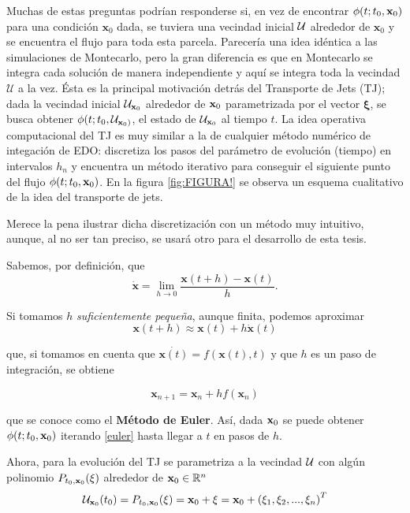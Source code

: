 Muchas de estas preguntas podrían responderse si, en vez de encontrar $\phi(t;t_0,\mathbf{x}_0)$ para una condición $\mathbf{x}_0$ dada, se tuviera una vecindad inicial $\mathcal{U}$ alrededor de $\mathbf{x}_0$ y se encuentra el flujo para toda esta parcela. Parecería una idea idéntica a las simulaciones de Montecarlo, pero la gran diferencia es que en Montecarlo se integra cada solución de manera independiente y aquí se integra toda la vecindad $\mathcal{U}$ a la vez. Ésta es la principal motivación detrás del Transporte de Jets (TJ); dada la vecindad inicial $\mathcal{U}_{\mathbf{x}_0}$ alrededor de $\mathbf{x}_0$ parametrizada por el vector $\mathbf{\xi}$, se busca obtener $\phi(t;t_0,\mathcal{U}_{\mathbf{x}_0)}$, el estado de $\mathcal{U}_{\mathbf{x}_0}$ al tiempo $t$. La idea operativa computacional del TJ es muy similar a la de cualquier método numérico de integación de EDO: discretiza los pasos del parámetro de evolución (tiempo) en intervalos $h_n$ y encuentra un método iterativo para conseguir el siguiente punto del flujo $\phi(t;t_0,\mathbf{x}_0)$. En la figura \ref{fig:FIGURA!} se observa un esquema cualitativo de la idea del transporte de jets.


Merece la pena ilustrar dicha discretización con un método muy intuitivo, aunque, al  no ser tan preciso, se usará otro para el desarrollo de esta tesis.

Sabemos, por definición, que 
\begin{equation*}
\dot{\mathbf{x}} = \lim_{h\to 0} \frac{\mathbf{x}(t+h)-\mathbf{x}(t)}{h}.
\end{equation*}  

Si tomamos $h$ \textit{suficientemente pequeña}, aunque finita, podemos aproximar
\begin{equation*}
\mathbf{x}(t+h) \approx \mathbf{x}(t) + h \dot{\mathbf{x}}(t)
\end{equation*}

que, si tomamos en cuenta que $\dot{\mathbf{x}(t)} = f(\mathbf{x}(t),t)$ y que $h$ es un paso de integración, se obtiene
 
\begin{equation}
\mathbf{x}_{n+1} = \mathbf{x}_n + h f(\mathbf{x}_n)
\label{eq:euler} 
\end{equation}

que se conoce como el \textbf{Método de Euler}. Así, dada $\mathbf{x}_0$ se puede obtener $\phi(t;t_0,\mathbf{x}_0)$ iterando \ref{euler} hasta llegar a $t$ en pasos de $h$.

Ahora, para la evolución del TJ se parametriza a la vecindad $\mathcal{U}$ con algún polinomio $P_{t_0,\mathbf{x}_0}(\xi)$ alrededor de $\mathbf{x}_0 \in \mathbb{R}^n$ 
\begin{equation*}
\mathcal{U}_{\mathbf{x}_0}(t_0) = P_{t_0,\mathbf{x}_0}(\xi) = \mathbf{x}_0 + \xi = \mathbf{x}_0 + \left( \xi_1, \xi_2, ..., \xi_n \right)^T
\end{equation*} 


